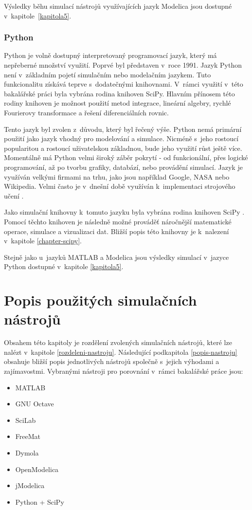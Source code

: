 Výsledky běhu simulací nástrojů využívajících jazyk Modelica jsou dostupné v~kapitole~\ref{kapitola5}.

\subsection*{Python}
Python je volně dostupný interpretovaný programovací jazyk, který má nepřeberné množství využití. Poprvé byl představen v~roce 1991. Jazyk Python není v~základním pojetí simulačním nebo modelačním jazykem. Tuto funkcionalitu získává teprve s~dodatečnými knihovnami. V~rámci využití v~této bakalářské práci byla vybrána rodina knihoven SciPy. Hlavním přínosem této rodiny knihoven je možnost použití metod integrace, lineární algebry, rychlé Fourierovy transformace a řešení diferenciálních rovnic.

Tento jazyk byl zvolen z~důvodu, který byl řečený výše. Python nemá primární použití jako jazyk vhodný pro modelování a simulace. Nicméně s~jeho rostoucí popularitou a rostoucí uživatelskou základnou, bude jeho využití růst ještě více. Momentálně má Python velmi široký záběr pokrytí - od funkcionální, přes logické programování, až po tvorbu grafiky, databází, nebo provádění simulací. Jazyk je využíván velkými firmami na trhu, jako jsou například Google, NASA nebo Wikipedia. Velmi často je v~dnešní době využíván k~implementaci strojového učení \cite{kirk2017thoughtful}.

Jako simulační knihovny k~tomuto jazyku byla vybrána rodina knihoven SciPy \cite{scipy} \cite{Nunez-Iglesias:2017:ESA:3169538}. Pomocí těchto knihoven je následně možné prováděť náročnější matematické operace, simulace a vizualizaci dat. Bližší popis této knihovny je k~nalezení v~kapitole \ref{chapter-scipy}.

Stejně jako u~jazyků MATLAB a Modelica jsou výsledky simulací v~jazyce Python dostupné v~kapitole \ref{kapitola5}.

\chapter{Popis použitých simulačních nástrojů}
\label{kapitola3}

Obsahem této kapitoly je rozdělení zvolených simulačních nástrojů, které lze nalézt v~kapitole \ref{rozdeleni-nastroju}. Následující podkapitola \ref{popis-nastroju} obsahuje bližší popis jednotlivých nástrojů společně s~jejich výhodami a zajímavostmi. Vybranými nástroji pro porovnání v~rámci bakalářské práce jsou:
\begin{itemize}
    \item MATLAB
    \item GNU Octave
    \item SciLab
    \item FreeMat
    \item Dymola
    \item OpenModelica
    \item jModelica
    \item Python + SciPy
\end{itemize}

